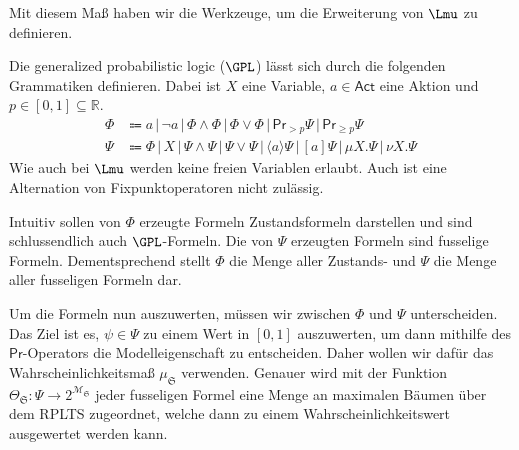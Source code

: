Mit diesem Maß haben wir die Werkzeuge, um die Erweiterung von $\Lmu$ zu definieren.
\begin{definition}
	Die generalized probabilistic logic ($\GPL$) lässt sich durch die folgenden Grammatiken definieren. Dabei ist $X$ eine Variable, $a\in \mathsf{Act}$ eine Aktion und $p\in [0,1]\subseteq \mathbb{R}$.
	\begin{align*}
		\Phi &\Coloneqq a \,|\, \neg a \,|\, \Phi \land \Phi \,|\, \Phi\lor \Phi\,|\, \mathsf{Pr}_{>p}\Psi \,|\, \mathsf{Pr}_{\geq p}\Psi \\
		\Psi &\Coloneqq \Phi \,|\, X \,|\, \Psi\land\Psi \,|\, \Psi\lor \Psi \,|\, \langle a \rangle\Psi \,|\, [a]\Psi \,|\, \mu X.\Psi \,|\, \nu X.\Psi
	\end{align*}
	Wie auch bei $\Lmu$ werden keine freien Variablen erlaubt.
	Auch ist eine Alternation von Fixpunktoperatoren nicht zulässig.
	
	Intuitiv sollen von $\Phi$ erzeugte Formeln Zustandsformeln darstellen und sind schlussendlich auch $\GPL$-Formeln. Die von $\Psi$ erzeugten Formeln sind fusselige Formeln.
	Dementsprechend stellt $\Phi$ die Menge aller Zustands- und $\Psi$ die Menge aller fusseligen Formeln dar.
\end{definition}

Um die Formeln nun auszuwerten, müssen wir zwischen $\Phi$ und $\Psi$ unterscheiden.
Das Ziel ist es, $\psi\in \Psi$ zu einem Wert in $[0,1]$ auszuwerten, um dann mithilfe des $\mathsf{Pr}$-Operators die Modelleigenschaft zu entscheiden.
Daher wollen wir dafür das Wahrscheinlichkeitsmaß $\mu_\mathfrak{S}$ verwenden.
Genauer wird mit der Funktion $\Theta_\mathfrak{S}:\Psi \to 2^{\mathcal{M}_\mathfrak{S}}$ jeder fusseligen Formel eine Menge an maximalen Bäumen über dem RPLTS zugeordnet, welche dann zu einem Wahrscheinlichkeitswert ausgewertet werden kann. \cite{cleaveland2005probabilistic}

